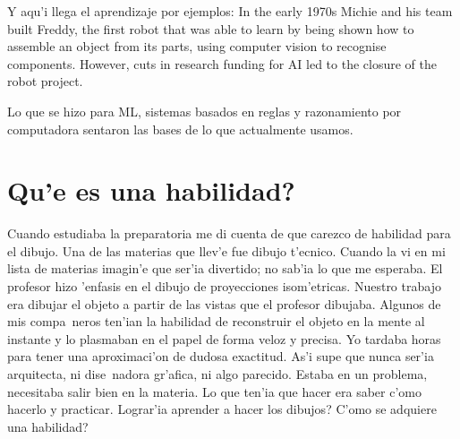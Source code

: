 \documentclass[11pt]{article}
\begin{document}




Y aqu'i llega el aprendizaje por ejemplos:
In the early 1970s Michie and his team built Freddy, the first robot that was able to learn by being shown how to assemble an object from its parts, using computer vision to recognise components. However, cuts in research funding for AI led to the closure of the robot project.

Lo que se hizo para ML, sistemas basados en reglas y razonamiento por computadora sentaron las bases de lo que actualmente usamos.


\section{\textquestiondown Qu'e es una habilidad?} 

Cuando estudiaba la preparatoria me di cuenta de que carezco de habilidad para el dibujo. Una de las materias que llev'e fue dibujo t'ecnico. Cuando la vi en mi lista de materias imagin'e que ser'ia divertido; no sab'ia lo que me esperaba. El profesor hizo 'enfasis en el dibujo de proyecciones isom'etricas. Nuestro trabajo era dibujar el objeto a partir de las vistas que el profesor dibujaba. Algunos de mis compa~neros ten'ian la habilidad de reconstruir el objeto en la mente al instante y lo plasmaban en el papel de forma veloz y precisa. Yo tardaba horas para tener una aproximaci'on de dudosa exactitud. As'i supe que nunca ser'ia arquitecta, ni dise~nadora gr'afica, ni algo parecido. Estaba en un problema, necesitaba salir bien en la materia. Lo que ten'ia que hacer era saber c'omo hacerlo y practicar. \textquestiondown Lograr'ia aprender a hacer los dibujos? \textquestiondown C'omo se adquiere una habilidad?
\end{document}
